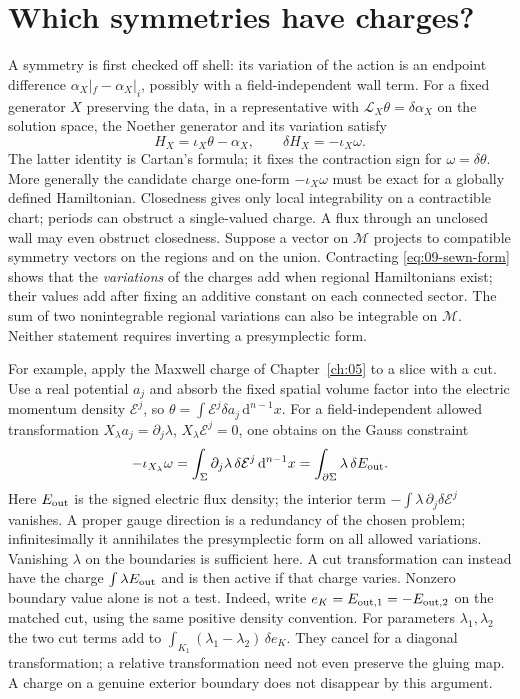 \section{Which symmetries have charges?}

A symmetry is first checked off shell: its variation of the action is an endpoint difference $\alpha_X|_{f}-\alpha_X|_{i}$, possibly with a field-independent wall term. For a fixed generator $X$ preserving the data, in a representative with $\mathcal L_X\theta=\delta\alpha_X$ on the solution space, the Noether generator and its variation satisfy
\[
 H_X=\iota_X\theta-\alpha_X,\qquad
 \delta H_X=-\iota_X\omega .
\]
The latter identity is Cartan's formula; it fixes the contraction sign for $\omega=\delta\theta$. More generally the candidate charge one-form $-\iota_X\omega$ must be exact for a globally defined Hamiltonian. Closedness gives only local integrability on a contractible chart; periods can obstruct a single-valued charge. A flux through an unclosed wall may even obstruct closedness. Suppose a vector on $\mathcal M$ projects to compatible symmetry vectors on the regions and on the union. Contracting \eqref{eq:09-sewn-form} shows that the \emph{variations} of the charges add when regional Hamiltonians exist; their values add after fixing an additive constant on each connected sector. The sum of two nonintegrable regional variations can also be integrable on $\mathcal M$. Neither statement requires inverting a presymplectic form.

For example, apply the Maxwell charge of Chapter~\ref{ch:05} to a slice with a cut. Use a real potential $a_j$ and absorb the fixed spatial volume factor into the electric momentum density $\mathcal E^j$, so $\theta=\int\mathcal E^j\delta a_j\,\mathrm{d}^{n-1}x$. For a field-independent allowed transformation $X_\lambda a_j=\partial_j\lambda$, $X_\lambda\mathcal E^j=0$, one obtains on the Gauss constraint
\begin{equation}
 -\iota_{X_\lambda}\omega
 =\int_{\Sigma}\partial_j\lambda\,\delta\mathcal E^j\,\mathrm{d}^{n-1}x
 =\int_{\partial\Sigma}\lambda\,\delta E_{\rm out} .
 \label{eq:09-max-charge}
\end{equation}
Here $E_{\rm out}$ is the signed electric flux density; the interior term $-\int\lambda\,\partial_j\delta\mathcal E^j$ vanishes. A proper gauge direction is a redundancy of the chosen problem; infinitesimally it annihilates the presymplectic form on all allowed variations. Vanishing $\lambda$ on the boundaries is sufficient here. A cut transformation can instead have the charge $\int\lambda E_{\rm out}$ and is then active if that charge varies. Nonzero boundary value alone is not a test. Indeed, write $e_K=E_{{\rm out},1}=-E_{{\rm out},2}$ on the matched cut, using the same positive density convention. For parameters $\lambda_1,\lambda_2$ the two cut terms add to $\int_{K_1}(\lambda_1-\lambda_2)\,\delta e_K$. They cancel for a diagonal transformation; a relative transformation need not even preserve the gluing map. A charge on a genuine exterior boundary does not disappear by this argument.

